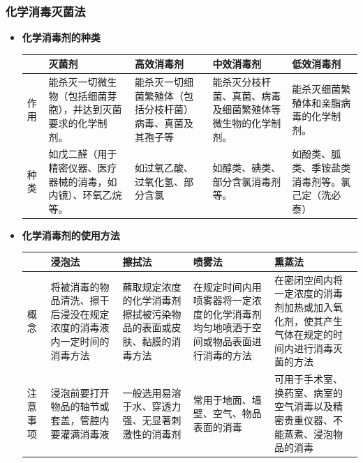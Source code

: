 \documentclass[11pt, a4paper]{ctexart}
\begin{document}
\subsubsection{化学消毒灭菌法}
\begin{itemize}
    \item \textbf{化学消毒剂的种类}
    \begin{table}[htbp]
    \centering
    \begin{tabular}{|p{2cm}|p{3cm}|p{3cm}|p{3cm}|p{3cm}|}
    \hline
     & \textbf{灭菌剂} & \textbf{高效消毒剂} & \textbf{中效消毒剂} & \textbf{低效消毒剂} \\
    \hline
    作用 & 能杀灭一切微生物（包括细菌芽胞），并达到灭菌要求的化学制剂。 & 能杀灭一切细菌繁殖体（包括分枝杆菌）病毒、真菌及其孢子等 & 能杀灭分枝杆菌、真菌、病毒及细菌繁殖体等微生物的化学制剂。 & 能杀灭细菌繁殖体和亲脂病毒的化学制剂。 \\
    \hline
    种类 & 如戊二醛（用于精密仪器、医疗器械的消毒，如内镜）、环氧乙烷等。 & 如过氧乙酸、过氧化氢、部分含氯 & 如醇类、碘类、部分含氯消毒剂等。 & 如酚类、胍类、季铵盐类消毒剂等。氯己定（洗必泰） \\
    \hline
    \end{tabular}
    \end{table}
    \item \textbf{化学消毒剂的使用方法}
    \begin{table}[htbp]
    \centering
    \begin{tabular}{|p{2cm}|p{3cm}|p{3cm}|p{3cm}|p{3cm}|}
    \hline
     & \textbf{浸泡法} & \textbf{擦拭法} & \textbf{喷雾法} & \textbf{熏蒸法} \\
    \hline
    概念 & 将被消毒的物品清洗、擦干后浸没在规定浓度的消毒液内一定时间的消毒方法 & 蘸取规定浓度的化学消毒剂擦拭被污染物品的表面或皮肤、黏膜的消毒方法 & 在规定时间内用喷雾器将一定浓度的化学消毒剂均匀地喷洒于空间或物品表面进行消毒的方法 & 在密闭空间内将一定浓度的消毒剂加热或加入氧化剂，使其产生气体在规定的时间内进行消毒灭菌的方法 \\
    \hline
    注意事项 & 浸泡前要打开物品的轴节或套盖，管腔内要灌满消毒液 & 一般选用易溶于水、穿透力强、无显著刺激性的消毒剂 & 常用于地面、墙壁、空气、物品表面的消毒 & 可用于手术室、换药室、病室的空气消毒以及精密贵重仪器、不能蒸煮、浸泡物品的消毒 \\
    \hline
    \end{tabular}
    \end{table}
\end{itemize}
\end{document}
